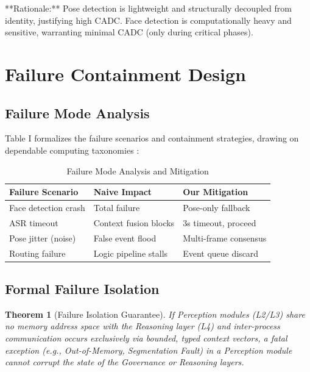 \documentclass[conference]{IEEEtran}
\newtheorem{theorem}{Theorem}
\begin{document}
**Rationale:** Pose detection is lightweight and structurally decoupled from identity, justifying high CADC. Face detection is computationally heavy and sensitive, warranting minimal CADC (only during critical phases).

\section{Failure Containment Design}

\subsection{Failure Mode Analysis}
Table I formalizes the failure scenarios and containment strategies, drawing on dependable computing taxonomies \cite{b18}:

\begin{table}[htbp]
\caption{Failure Mode Analysis and Mitigation}
\begin{center}
\begin{tabular}{lll}
\toprule
\textbf{Failure Scenario} & \textbf{Naive Impact} & \textbf{Our Mitigation} \\
\midrule
Face detection crash & Total failure & Pose-only fallback \\
ASR timeout & Context fusion blocks & 3s timeout, proceed \\
Pose jitter (noise) & False event flood & Multi-frame consensus \\
Routing failure & Logic pipeline stalls & Event queue discard \\
\bottomrule
\end{tabular}
\end{center}
\end{table}

\subsection{Formal Failure Isolation}
\begin{theorem}[Failure Isolation Guarantee]
If Perception modules (L2/L3) share no memory address space with the Reasoning layer (L4) and inter-process communication occurs exclusively via bounded, typed context vectors, a fatal exception (e.g., Out-of-Memory, Segmentation Fault) in a Perception module cannot corrupt the state of the Governance or Reasoning layers.
\end{theorem}
\end{document}
